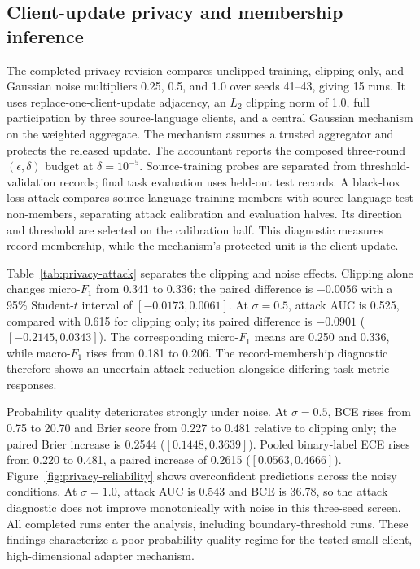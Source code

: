 \documentclass[a4paper,fleqn]{cas-sc}
\begin{document}
\subsection{Client-update privacy and membership inference}

The completed privacy revision compares unclipped training, clipping only, and Gaussian noise multipliers 0.25, 0.5, and 1.0 over seeds 41--43, giving 15 runs. It uses replace-one-client-update adjacency, an $L_2$ clipping norm of 1.0, full participation by three source-language clients, and a central Gaussian mechanism on the weighted aggregate. The mechanism assumes a trusted aggregator and protects the released update. The accountant reports the composed three-round $(\epsilon,\delta)$ budget at $\delta=10^{-5}$. Source-training probes are separated from threshold-validation records; final task evaluation uses held-out test records. A black-box loss attack compares source-language training members with source-language test non-members, separating attack calibration and evaluation halves. Its direction and threshold are selected on the calibration half. This diagnostic measures record membership, while the mechanism's protected unit is the client update.



Table~\ref{tab:privacy-attack} separates the clipping and noise effects. Clipping alone changes micro-$F_1$ from 0.341 to 0.336; the paired difference is $-0.0056$ with a 95\% Student-$t$ interval of $[-0.0173,0.0061]$. At $\sigma=0.5$, attack AUC is 0.525, compared with 0.615 for clipping only; its paired difference is $-0.0901$ ($[-0.2145,0.0343]$). The corresponding micro-$F_1$ means are 0.250 and 0.336, while macro-$F_1$ rises from 0.181 to 0.206. The record-membership diagnostic therefore shows an uncertain attack reduction alongside differing task-metric responses.

Probability quality deteriorates strongly under noise. At $\sigma=0.5$, BCE rises from 0.75 to 20.70 and Brier score from 0.227 to 0.481 relative to clipping only; the paired Brier increase is 0.2544 ($[0.1448,0.3639]$). Pooled binary-label ECE rises from 0.220 to 0.481, a paired increase of 0.2615 ($[0.0563,0.4666]$). Figure~\ref{fig:privacy-reliability} shows overconfident predictions across the noisy conditions. At $\sigma=1.0$, attack AUC is 0.543 and BCE is 36.78, so the attack diagnostic does not improve monotonically with noise in this three-seed screen. All completed runs enter the analysis, including boundary-threshold runs. These findings characterize a poor probability-quality regime for the tested small-client, high-dimensional adapter mechanism.
\end{document}

